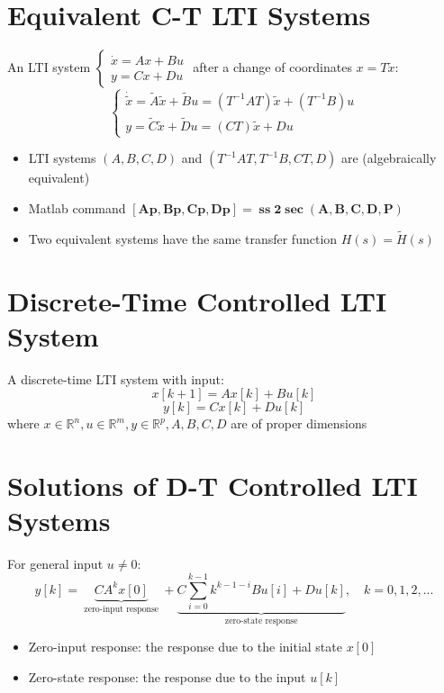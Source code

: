 \documentclass[10pt,a4paper,oneside]{article}
\begin{document}
\section{Equivalent C-T LTI Systems}
An LTI system $\left\{\begin{array}{l}{\dot{x}=A x+B u} \\ {y=C x+D u}\end{array}\right.$ after a change of coordinates $x=T\tilde{x}$:
\[
\left\{\begin{array}{l}{\dot{\tilde{x}}=\tilde{A} \tilde{x}+\tilde{B} u=\left(T^{-1} A T\right) \tilde{x}+\left(T^{-1} B\right) u} \\ {y=\tilde{C} \tilde{x}+\tilde{D} u=(C T) \tilde{x}+D u}\end{array}\right.
\]
\begin{itemize}
\item LTI systems $(A,B,C,D)$ and $\left(T^{-1} A T, T^{-1} B, CT, D\right)$ are (algebraically equivalent)
\item Matlab command $\mathbf{[A p, B p, C p, D p]=\operatorname{ss} 2 \sec (A, B, C, D, P)}$
\item Two equivalent systems have the same transfer function $H(s)=\tilde{H}(s)$
\end{itemize}
\section{Discrete-Time Controlled LTI System}
A discrete-time LTI system with input:
\[
x[k+1]=A x[k]+B u[k]
\]
\[
y[k]=C x[k]+D u[k]
\]
where $x \in \mathbb{R}^{n}, u \in \mathbb{R}^{m}, y \in \mathbb{R}^{p}, A, B, C, D$ are of proper dimensions
\section{Solutions of D-T Controlled LTI Systems}
For general input $u\neq0$:
\[
y[k]=\underbrace{C A^{k} x[0]}_{\text { zero-input response }}+\underbrace{C \sum_{i=0}^{k-1} k^{k-1-i} B u[i] +D u[k]}_{\text { zero-state response }}, \quad k=0,1,2,...
\]
\begin{itemize}
\item Zero-input response: the response due to the initial state $x[0]$
\item Zero-state response: the response due to the input $u[k]$
\end{itemize}
\end{document}
